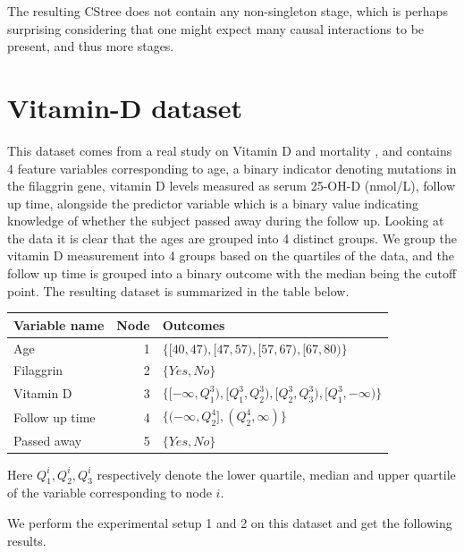 \documentclass{tufte-book}
\begin{document}
\begin{Definition}
\begin{figure}[!h]
\begin{floatrow}
   \end{floatrow}
\end{figure}

The resulting CStree does not contain any non-singleton stage, which is perhaps surprising considering that one might expect many causal interactions to be present, and thus more stages. 


\section{Vitamin-D dataset}
\label{sec:orgbb16b32}
This dataset comes from a real study on Vitamin D and mortality \cite{martinussen-2017-instr-variab}, and contains 4 feature variables corresponding to age, a binary indicator denoting mutations in the filaggrin gene, vitamin D levels measured  as serum 25-OH-D (nmol/L), follow up time, alongside the predictor variable which is a binary value indicating knowledge of whether the subject passed away during the follow up. Looking at the data it is clear that the ages are grouped into 4 distinct groups. We group the vitamin D measurement into 4 groups based on the quartiles of the data, and the follow up time is grouped into a binary outcome with the median being the cutoff point. The resulting dataset is summarized in the table below.

\begin{center}
\begin{tabular}{l|r|l}
\hline
Variable name & Node & Outcomes\\
\hline
Age & 1 & \(\{[40,47),[47,57),[57,67),[67,80)\}\)\\
Filaggrin & 2 & \(\{Yes,No\}\)\\
Vitamin D & 3 & \(\{ [-\infty,Q^3_1),[Q^3_1,Q^3_2),[Q^3_2,Q^3_3),[Q^3_1,-\infty) \}\)\\
Follow up time & 4 & \(\{(-\infty, Q^4_2],(Q^4_2, \infty) \}\)\\
Passed away & 5 & \(\{Yes,No \}\)\\
\end{tabular}
\end{center}

Here \(Q^i_1,Q^i_2,Q^i_3\) respectively denote the lower quartile, median and upper quartile of the variable corresponding to node \(i\).


We perform the experimental setup 1 and 2 on this dataset and get the following results.


\end{Definition}
\end{document}
